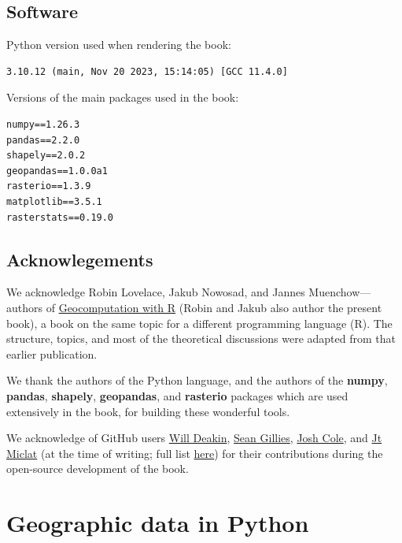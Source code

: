 \documentclass[
  letterpaper,
]{krantz}
\begin{document}
\section*{Software}\label{software}


Python version used when rendering the book:

\begin{verbatim}
3.10.12 (main, Nov 20 2023, 15:14:05) [GCC 11.4.0]
\end{verbatim}

Versions of the main packages used in the book:

\begin{verbatim}
numpy==1.26.3
pandas==2.2.0
shapely==2.0.2
geopandas==1.0.0a1
rasterio==1.3.9
matplotlib==3.5.1
rasterstats==0.19.0
\end{verbatim}

\section*{Acknowlegements}\label{acknowlegements}


We acknowledge Robin Lovelace, Jakub Nowosad, and Jannes
Muenchow---authors of \href{https://r.geocompx.org/}{Geocomputation with
R} (Robin and Jakub also author the present book), a book on the same
topic for a different programming language (R). The structure, topics,
and most of the theoretical discussions were adapted from that earlier
publication.

We thank the authors of the Python language, and the authors of the
\textbf{numpy}, \textbf{pandas}, \textbf{shapely}, \textbf{geopandas},
and \textbf{rasterio} packages which are used extensively in the book,
for building these wonderful tools.

We acknowledge of GitHub users
\href{https://github.com/anisotropi4}{Will Deakin},
\href{https://github.com/sgillies}{Sean Gillies},
\href{https://github.com/JoshCole-DTA}{Josh Cole}, and
\href{https://github.com/jtmiclat}{Jt Miclat} (at the time of writing;
full list
\href{https://github.com/geocompx/geocompy/graphs/contributors}{here})
for their contributions during the open-source development of the book.


\chapter{Geographic data in Python}\label{sec-spatial-class}
\end{document}
